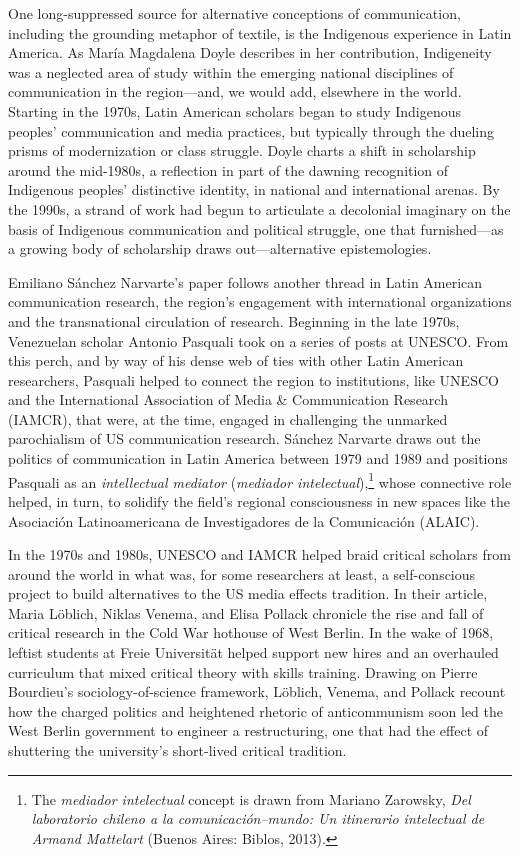 \documentclass{tufte-handout}
\begin{document}
One long-suppressed source for alternative conceptions of communication,
including the grounding metaphor of textile, is the Indigenous
experience in Latin America. As María Magdalena Doyle describes in her
contribution, Indigeneity was a neglected area of study within the
emerging national disciplines of communication in the region---and, we
would add, elsewhere in the world. Starting in the 1970s, Latin American
scholars began to study Indigenous peoples' communication and media
practices, but typically through the dueling prisms of modernization or
class struggle. Doyle charts a shift in scholarship around the
mid-1980s, a reflection in part of the dawning recognition of Indigenous
peoples' distinctive identity, in national and international arenas. By
the 1990s, a strand of work had begun to articulate a decolonial
imaginary on the basis of Indigenous communication and political
struggle, one that furnished---as a growing body of scholarship draws
out---alternative epistemologies.

Emiliano Sánchez Narvarte's paper follows another thread in Latin
American communication research, the region's engagement with
international organizations and the transnational circulation of
research. Beginning in the late 1970s, Venezuelan scholar Antonio
Pasquali took on a series of posts at UNESCO. From this perch, and by
way of his dense web of ties with other Latin American researchers,
Pasquali helped to connect the region to institutions, like UNESCO and
the International Association of Media \& Communication Research
(IAMCR), that were, at the time, engaged in challenging the unmarked
parochialism of US communication research. Sánchez Narvarte draws out
the politics of communication in Latin America between 1979 and 1989 and
positions Pasquali as an \emph{intellectual mediator} (\emph{mediador
intelectual}),\footnote{The \emph{mediador intelectual} concept is drawn
  from Mariano Zarowsky, \emph{Del laboratorio chileno a la
  comunicación--mundo: Un itinerario intelectual de Armand Mattelart}
  (Buenos Aires: Biblos, 2013).} whose connective role helped, in turn,
to solidify the field's regional consciousness in new spaces like the
Asociación Latinoamericana de Investigadores de la Comunicación (ALAIC).

In the 1970s and 1980s, UNESCO and IAMCR helped braid critical scholars
from around the world in what was, for some researchers at least, a
self-conscious project to build alternatives to the US media effects
tradition. In their article, Maria Löblich, Niklas Venema, and Elisa
Pollack chronicle the rise and fall of critical research in the Cold War
hothouse of West Berlin. In the wake of 1968, leftist students at Freie
Universität helped support new hires and an overhauled curriculum that
mixed critical theory with skills training. Drawing on Pierre Bourdieu's
sociology-of-science framework, Löblich, Venema, and Pollack recount how
the charged politics and heightened rhetoric of anticommunism soon led
the West Berlin government to engineer a restructuring, one that had the
effect of shuttering the university's short-lived critical tradition.
\end{document}
